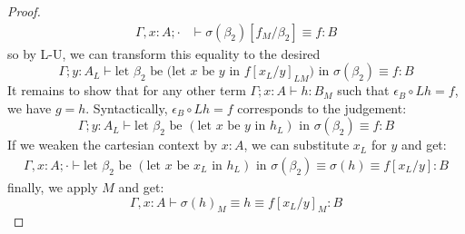 \begin{thm}[$L \dashv M$]
\begin{proof}
\[\begin{split}
    \Gamma, x : A; \cdot &\vdash \sigma(\beta_2)[f_M / \beta_2] \equiv f : B
  \end{split}
\]
so by L-U, we can transform this equality to the desired
\[
\Gamma; y : A_L \vdash \text{let $\beta_2$ be (let $x$ be $y$ in $f[x_L/y]_{LM}$) in }\sigma(\beta_2) \equiv f : B
\]
  It remains to show that for any other term $\Gamma; x : A \vdash h : B_M$ such that $\epsilon_B \circ Lh = f$, we have $g = h$. Syntactically, $\epsilon_B \circ Lh = f$  corresponds to the judgement:
  \[
    \Gamma; y : A_L \vdash \text{let $\beta_2$ be $(\text{let $x$ be $y$ in $h_L$})$ in }\sigma(\beta_2) \equiv f : B
  \]
  If we weaken the cartesian context by $x : A$, we can substitute $x_L$ for $y$ and get:
  \[
    \begin{split}
      \Gamma, x : A; \cdot \vdash \text{let $\beta_2$ be $(\text{let $x$ be $x_L$ in $h_L$})$ in }\sigma(\beta_2) \equiv \sigma(h) \equiv f[x_L/y] : B
    \end{split}
    \]
    finally, we apply $M$ and get:
    \[
      \Gamma, x : A \vdash \sigma(h)_M \equiv h \equiv f[x_L/y]_M : B
    \]
\end{proof}
\end{thm}
